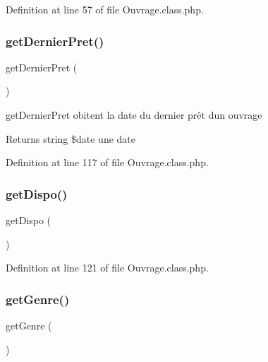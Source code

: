 Definition at line 57 of file Ouvrage.\+class.\+php.

\mbox{\label{class_ouvrage_a4b75677068888dc7bc613d2d70ccd952}} 
\subsubsection{\texorpdfstring{get\+Dernier\+Pret()}{getDernierPret()}}
{\footnotesize\ttfamily get\+Dernier\+Pret (\begin{DoxyParamCaption}{ }\end{DoxyParamCaption})}

get\+Dernier\+Pret obitent la date du dernier prêt d\textquotesingle{}un ouvrage \begin{DoxyReturn}{Returns}
string \$date une date 
\end{DoxyReturn}


Definition at line 117 of file Ouvrage.\+class.\+php.

\mbox{\label{class_ouvrage_a283e5079d0f579ed83c210845ec392f1}} 
\subsubsection{\texorpdfstring{get\+Dispo()}{getDispo()}}
{\footnotesize\ttfamily get\+Dispo (\begin{DoxyParamCaption}{ }\end{DoxyParamCaption})}



Definition at line 121 of file Ouvrage.\+class.\+php.

\mbox{\label{class_ouvrage_adc6f217756d49edbac6975e1f69485d5}} 
\subsubsection{\texorpdfstring{get\+Genre()}{getGenre()}}
{\footnotesize\ttfamily get\+Genre (\begin{DoxyParamCaption}{ }\end{DoxyParamCaption})}



